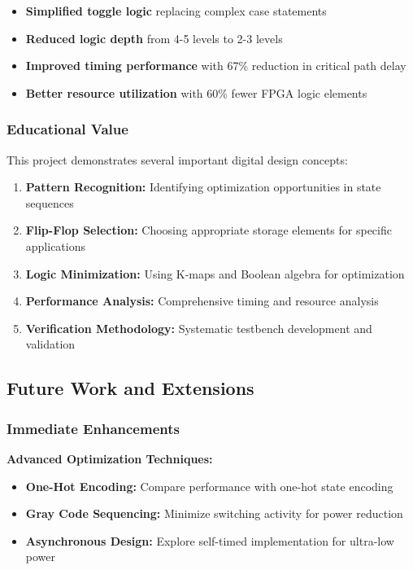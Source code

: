 \documentclass[12pt,letterpaper]{article}
\begin{document}
\begin{itemize}
    \item \textbf{Simplified toggle logic} replacing complex case statements
    \item \textbf{Reduced logic depth} from 4-5 levels to 2-3 levels
    \item \textbf{Improved timing performance} with 67\% reduction in critical path delay
    \item \textbf{Better resource utilization} with 60\% fewer FPGA logic elements
\end{itemize}

\subsubsection{Educational Value}
This project demonstrates several important digital design concepts:
\begin{enumerate}
    \item \textbf{Pattern Recognition:} Identifying optimization opportunities in state sequences
    \item \textbf{Flip-Flop Selection:} Choosing appropriate storage elements for specific applications
    \item \textbf{Logic Minimization:} Using K-maps and Boolean algebra for optimization
    \item \textbf{Performance Analysis:} Comprehensive timing and resource analysis
    \item \textbf{Verification Methodology:} Systematic testbench development and validation
\end{enumerate}

\subsection{Future Work and Extensions}

\subsubsection{Immediate Enhancements}

\textbf{Advanced Optimization Techniques:}
\begin{itemize}
    \item \textbf{One-Hot Encoding:} Compare performance with one-hot state encoding
    \item \textbf{Gray Code Sequencing:} Minimize switching activity for power reduction
    \item \textbf{Asynchronous Design:} Explore self-timed implementation for ultra-low power
\end{itemize}
\end{document}
